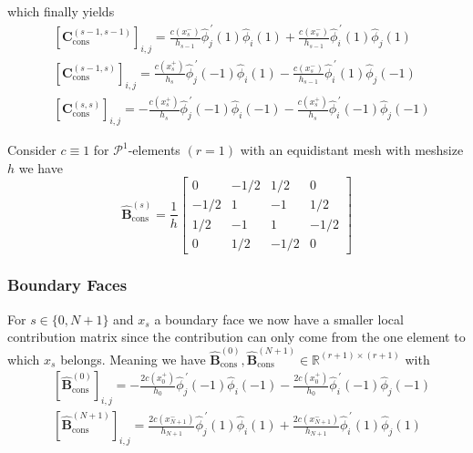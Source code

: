 which finally yields
\begin{align*}
	 & [\textbf{C}_{\text{cons}}^{(s-1,s-1)}]_{i,j} = \frac{c(x_s^-)}{h_{s-1}} \widehat{\phi}_j^{\,\prime}(1) \widehat{\phi}_i(1) + \frac{c(x_s^-)}{h_{s-1}} \widehat{\phi}_i^{\,\prime} (1) \widehat{\phi}_j(1)  \\
	 & [\textbf{C}_{\text{cons}}^{(s-1,s)}]_{i,j} = \frac{c(x_s^+)}{h_{s}} \widehat{\phi}_j^{\,\prime} (-1) \widehat{\phi}_i (1) - \frac{c(x_s^-)}{h_{s-1}} \widehat{\phi}_i^{\,\prime} (1) \widehat{\phi}_j (-1) \\
	 & [\textbf{C}_{\text{cons}}^{(s,s)}]_{i,j} = -\frac{c(x_s^+)}{h_s} \widehat{\phi}_j^{\,\prime} (-1) \widehat{\phi}_i (-1) - \frac{c(x_s^+)}{h_s} \widehat{\phi}_i^{\,\prime} (-1) \widehat{\phi}_j (-1)
\end{align*}
\begin{example}
	Consider $c\equiv 1$ for $\mathcal{P}^1$-elements $(r=1)$
	with an equidistant mesh with meshsize $h$ we have
	\begin{equation*}
		\widehat{\textbf{B}}_{\text{cons}}^{(s)} = \frac{1}{h}
		\begin{bmatrix}
			0    & -1/2 & 1/2  & 0    \\
			-1/2 & 1    & -1   & 1/2  \\
			1/2  & -1   & 1    & -1/2 \\
			0    & 1/2  & -1/2 & 0
		\end{bmatrix}
	\end{equation*}
\end{example}

\subsubsection{Boundary Faces}
For $s\in \{0, N+1 \}$ and $x_s$ a boundary face we now have a smaller local contribution matrix
since the contribution can only come from the one element to which $x_s$ belongs. Meaning we have
$\widehat{\textbf{B}}_{\text{cons}}^{(0)}, \widehat{\textbf{B}}_{\text{cons}}^{(N+1)} \in \mathbb{R}^{(r+1)\times (r+1)}$
with
\begin{align*}
	 & [\widehat{\textbf{B}}_{\text{cons}}^{(0)}]_{i,j} =
	-\frac{2 c(x_0^+)}{h_{0}} \widehat{\phi}_j^{\,\prime}(-1) \widehat{\phi}_i(-1) - \frac{2 c(x_0^+)}{h_{0}} \widehat{\phi}_i^{\,\prime} (-1) \widehat{\phi}_j(-1)         \\
	 & [\widehat{\textbf{B}}_{\text{cons}}^{(N+1)}]_{i,j} =
	\frac{2 c(x_{N+1}^-)}{h_{N+1}} \widehat{\phi}_j^{\,\prime}(1) \widehat{\phi}_i(1) + \frac{ 2 c(x_{N+1}^-)}{h_{N+1}} \widehat{\phi}_i^{\,\prime} (1) \widehat{\phi}_j(1) \\
\end{align*}

